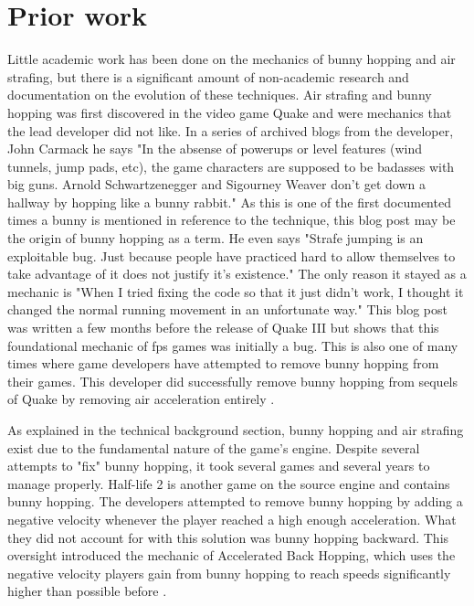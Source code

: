 \documentclass[10pt,twocolumn]{article}
\begin{document}
\section{Prior work}

Little academic work has been done on the mechanics of bunny hopping and air strafing, but there is a significant amount of non-academic research and documentation on the evolution of these techniques. Air strafing and bunny hopping was first discovered in the video game Quake and were mechanics that the lead developer did not like. In a series of archived blogs from the developer, John Carmack he says "In the absense of powerups or level features (wind tunnels, jump pads, etc), the game characters are supposed to be badasses with big guns. Arnold Schwartzenegger and Sigourney Weaver don't get down a hallway by hopping like a bunny rabbit." \cite{CarmackPlan} As this is one of the first documented times a bunny is mentioned in reference to the technique, this blog post may be the origin of bunny hopping as a term.
He even says "Strafe jumping is an exploitable bug. Just because people have practiced hard to allow themselves to take advantage of it does not justify it's existence." The only reason it stayed as a mechanic is "When I tried fixing the code so that it just didn't work, I thought it changed the normal running movement in an unfortunate way."\cite{CarmackPlan} This blog post was written a few months before the release of Quake III but shows that this foundational mechanic of fps games was initially a bug. This is also one of many times where game developers have attempted to remove bunny hopping from their games. This developer did successfully remove bunny hopping from sequels of Quake by removing air acceleration entirely \cite{bhopHistory}.
    
As explained in the technical background section, bunny hopping and air strafing exist due to the fundamental nature of the game's engine. Despite several attempts to "fix" bunny hopping, it took several games and several years to manage properly. Half-life 2 is another game on the source engine and contains bunny hopping. The developers attempted to remove bunny hopping by adding a negative velocity whenever the player reached a high enough acceleration. What they did not account for with this solution was bunny hopping backward. This oversight introduced the mechanic of Accelerated Back Hopping, which uses the negative velocity players gain from bunny hopping to reach speeds significantly higher than possible before \cite{ABH}.
\end{document}
